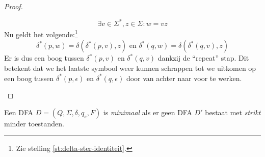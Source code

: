\documentclass[main.tex]{subfiles}
\begin{document}
\begin{st}
\begin{proof}
\begin{itemize}
\begin{itemize}
        \[ \exists v\in \Sigma^{*}, z \in \Sigma: w = vz \]
        Nu geldt het volgende:\footnote{Zie stelling \ref{st:delta-ster-identiteit}.}
        \[ \delta^{*}(p,w) = \delta(\delta^{*}(p,v),z) \text{ en } \delta^{*}(q,w) = \delta(\delta^{*}(q,v),z)\]
        Er is dus een boog tussen $\delta^{*}(p,v)$ en $\delta^{*}(q,v)$ dankzij de ``repeat'' stap.
        Dit betekent dat we het laatste symbool weer kunnen schrappen tot we uitkomen op een boog tussen $\delta^{*}(p,\epsilon)$ en $\delta^{*}(q,\epsilon)$ door van achter naar voor te werken.
      \end{itemize}
    \end{itemize}
  \end{proof}
\end{st}

\begin{de}
  Een DFA $D = (Q,\Sigma,\delta,q_{s},F)$ is \emph{minimaal} als er geen DFA $D'$ bestaat met \textit{strikt} minder toestanden.
\end{de}
\end{document}
